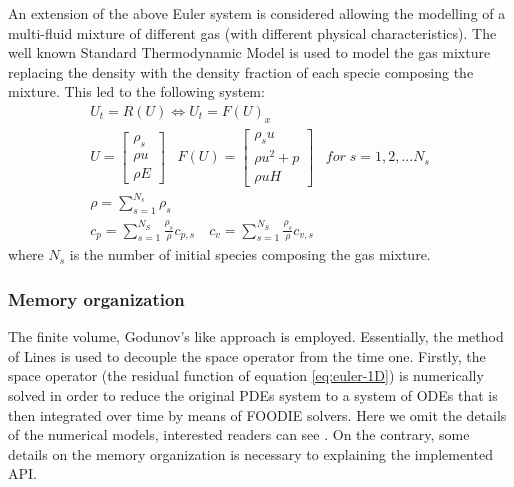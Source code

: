 An extension of the above Euler system is considered allowing the modelling of a multi-fluid mixture of different gas (with different physical characteristics). The well known Standard Thermodynamic Model is used to model the gas mixture replacing the density with the density fraction of each specie composing the mixture. This led to the following system:
\begin{equation}
\begin{matrix}
U_t = R(U)  \Leftrightarrow U_t = F(U)_x \\
U = \begin{bmatrix}
\rho_s \\
\rho u \\
\rho E
\end{bmatrix}\;\;\;
F(U) = \begin{bmatrix}
\rho_s u \\
\rho u^2 + p \\
\rho u H
\end{bmatrix}\;\;\; for\; s=1,2,...N_s \\
\rho = \sum_{s=1}^{N_s}\rho_s \\
c_p = \sum_{s=1}^{N_S} \frac{\rho_s}{\rho} c_{p,s} \quad  c_v = \sum_{s=1}^{N_S} \frac{\rho_s}{\rho} c_{v,s}
\end{matrix}
\end{equation}
where $N_s$ is the number of initial species composing the gas mixture.

\subsubsection{Memory organization}
The finite volume, Godunov's like approach is employed. Essentially, the method of Lines is used to decouple the space operator from the time one. Firstly, the space operator (the residual function of equation \ref{eq:euler-1D}) is numerically solved in order to reduce the original PDEs system to a system of ODEs that is then integrated over time by means of FOODIE solvers. Here we omit the details of the numerical models, interested readers can see \cite{}. On the contrary, some details on the memory organization is necessary to explaining the implemented API.

